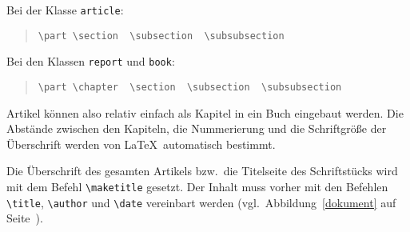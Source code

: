 \pagebreak[3] %
\noindent Bei der Klasse \texttt{article}:
\begin{quote}
\lstinline|\part \section  \subsection  \subsubsection|
\end{quote}
Bei den Klassen \texttt{report} und \texttt{book}:
\begin{quote}
\lstinline|\part \chapter  \section  \subsection  \subsubsection|
\end{quote}
Artikel können also relativ einfach als Kapitel in ein Buch
eingebaut werden.  Die Abstände zwischen den Kapiteln, die
Nummerierung und die Schriftgröße der Überschrift werden von
\LaTeX\ automatisch bestimmt.



Die Überschrift des gesamten Artikels bzw.\ die Titelseite des
Schriftstücks wird mit dem Befehl \lstinline|\maketitle| gesetzt.
Der Inhalt muss vorher mit den Befehlen \lstinline|\title|,
\lstinline|\author| und \lstinline|\date| vereinbart werden (vgl.\ 
Abbildung~\ref{dokument} auf Seite~\pageref{dokument}).

